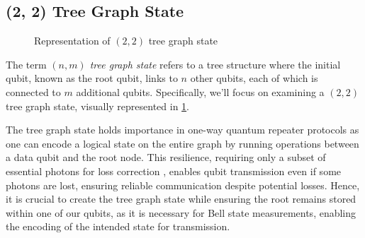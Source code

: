 \subsection{(2, 2) Tree Graph State}
\label{sec:2_2_tree}

\begin{figure}
    \centering
    
    \vspace{-1cm}
    \caption{Representation of $(2, 2)$ tree graph state}
    \label{fig:2_2_graph}
\end{figure}

The term \emph{$(n, m)$ tree graph state} refers to a tree structure where the initial qubit, known as the root qubit, links to $n$ other qubits, each of which is connected to $m$ additional qubits.
Specifically, we'll focus on examining a $(2, 2)$ tree graph state, visually represented in \cref{fig:2_2_graph}.

The tree graph state holds importance in one-way quantum repeater protocols as one can encode a logical state on the entire graph by running operations between a data qubit and the root node.
This resilience, requiring only a subset of essential photons for loss correction \cite{Why_tree_graph_state}, enables qubit transmission even if some photons are lost, ensuring reliable communication despite potential losses.
Hence, it is crucial to create the tree graph state while ensuring the root remains stored within one of our qubits, as it is necessary for Bell state measurements, enabling the encoding of the intended state for transmission.


